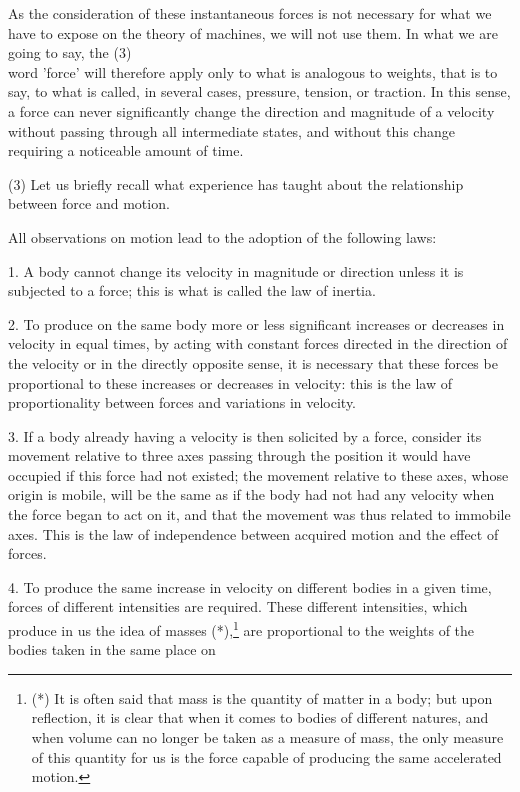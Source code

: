 \documentclass{book}
\begin{document}
As the consideration of these instantaneous forces is not necessary for what we have to expose on the theory of machines, we will not use them. In what we are going to say, the
\newpage
(3)
\\
word 'force' will therefore apply only to what is analogous to weights, that is to say, to what is called, in several cases, pressure, tension, or traction.
In this sense, a force can never significantly change the direction and magnitude of a velocity without passing through all intermediate states, and without this change requiring a noticeable amount of time.

(3) Let us briefly recall what experience has taught about the relationship between force and motion.

All observations on motion lead to the adoption of the following laws:

1. A body cannot change its velocity in magnitude or direction unless it is subjected to a force; this is what is called the law of inertia.

2. To produce on the same body more or less significant increases or decreases in velocity in equal times, by acting with constant forces directed in the direction of the velocity or in the directly opposite sense, it is necessary that these forces be proportional to these increases or decreases in velocity: this is the law of proportionality between forces and variations in velocity.

3. If a body already having a velocity is then solicited by a force, consider its movement relative to three axes passing through the position it would have occupied if this force had not existed; the movement relative to these axes, whose origin is mobile, will be the same as if the body had not had any velocity when the force began to act on it, and that the movement was thus related to immobile axes. This is the law of independence between acquired motion and the effect of forces.

4. To produce the same increase in velocity on different bodies in a given time, forces of different intensities are required. These different intensities, which produce in us the idea of masses (*),\footnote{(*) It is often said that mass is the quantity of matter in a body; but upon reflection, it is clear that when it comes to bodies of different natures, and when volume can no longer be taken as a measure of mass, the only measure of this quantity for us is the force capable of producing the same accelerated motion.} are proportional to the weights of the bodies taken in the same place on
\end{document}
